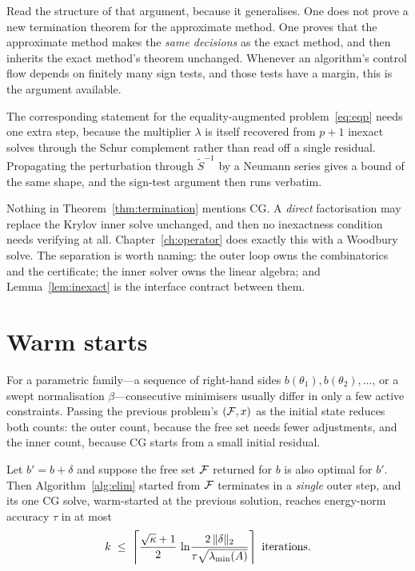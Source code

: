 Read the structure of that argument, because it generalises. One does not prove a
new termination theorem for the approximate method. One proves that the approximate
method makes the \emph{same decisions} as the exact method, and then inherits the
exact method's theorem unchanged. Whenever an algorithm's control flow depends on
finitely many sign tests, and those tests have a margin, this is the argument
available.

The corresponding statement for the equality-augmented problem~\eqref{eq:eqp} needs
one extra step, because the multiplier $\lambda$ is itself recovered from $p+1$
inexact solves through the Schur complement rather than read off a single residual.
Propagating the perturbation through $\tilde S^{-1}$ by a Neumann series gives a
bound of the same shape, and the sign-test argument then runs verbatim.

\begin{remark}
Nothing in Theorem~\ref{thm:termination} mentions CG. A \emph{direct} factorisation
may replace the Krylov inner solve unchanged, and then no inexactness condition
needs verifying at all. Chapter~\ref{ch:operator} does exactly this with a Woodbury
solve. The separation is worth naming: the outer loop owns the combinatorics and the
certificate; the inner solver owns the linear algebra; and Lemma~\ref{lem:inexact} is
the interface contract between them.
\end{remark}

\section{Warm starts}

For a parametric family---a sequence of right-hand sides $b(\theta_1), b(\theta_2),
\dots$, or a swept normalisation $\beta$---consecutive minimisers usually differ in
only a few active constraints. Passing the previous problem's $(\mathcal{F}, x)$ as the
initial state reduces both counts: the outer count, because the free set needs fewer
adjustments, and the inner count, because CG starts from a small initial residual.

\begin{proposition}
\label{prop:warm}
Let $b' = b + \delta$ and suppose the free set $\mathcal{F}$ returned for $b$ is also
optimal for $b'$. Then Algorithm~\ref{alg:elim} started from $\mathcal{F}$ terminates in a
\emph{single} outer step, and its one CG solve, warm-started at the previous
solution, reaches energy-norm accuracy $\tau$ in at most
\[
  k \;\le\; \left\lceil \frac{\sqrt{\kappa}+1}{2}\,
  \ln\!\frac{2\,\lVert \delta \rVert_2}{\tau\sqrt{\lambda_{\min}(A)}} \right\rceil
  \text{ iterations.}
\]
\end{proposition}

